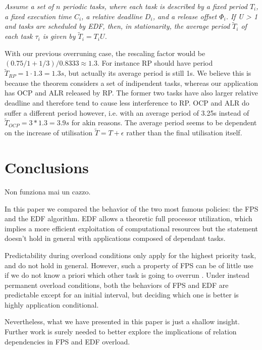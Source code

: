 \documentclass{article}
\begin{document}
\textit{Assume a set of $n$ periodic tasks, where each task is described by a fixed period $T_i$, a fixed execution time $C_i$, a relative deadline $D_i$, and a release offset $\Phi_i$. If U > 1 and tasks are scheduled by EDF, then, in stationarity, the average period $\tilde{T}_i$ of each task $\tau_i$ is given by $\tilde{T}_i = T_iU$.}

With our previous overruning case, the rescaling factor would be $(0.75 / 1 + 1/3) / 0.8333 \approx 1.3$. For instance RP should have period $\tilde{T}_{RP} = 1 \cdot 1.3 = 1.3s$, but actually its average period is still 1s. We believe this is because the theorem considers a set of indipendent tasks, whereas our application has OCP and ALR released by RP. The former two tasks have also larger relative deadline and therefore tend to cause less interference to RP. OCP and ALR do suffer a different period however, i.e. with an average period of 3.25s instead of $\tilde{T}_{OCP} = 3 * 1.3 = 3.9s$ for akin reasons. The average period seems to be dependent on the increase of utilisation $\tilde{T} = T + \epsilon$ rather than the final utilisation itself.

\section{Conclusions}

Non funziona mai un cazzo.

In this paper we compared the behavior of the two most famous policies: the FPS and the EDF algorithm. EDF allows a theoretic full processor utilization, which implies a more efficient exploitation of computational resources but the statement doesn't hold in general with applications composed of dependant tasks.

Predictability during overload conditions only apply for the highest priority task, and do not hold in general. However, such a property of FPS can be of little use if we do not know a priori which other task is going to overrun \cite{buttazzo-rm-edf}. Under instead permanent overload conditions, both the behaviors of FPS and EDF are predictable except for an initial interval, but deciding which one is better is highly application conditional.

Nevertheless, what we have presented in this paper is just a shallow insight. Further work is surely needed to better explore the implications of relation dependencies in FPS and EDF overload.


\end{document}
